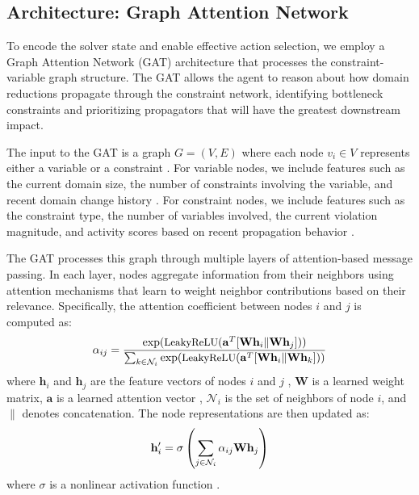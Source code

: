 \documentclass[11pt]{article}
\begin{document}
\subsection{Architecture: Graph Attention Network}

To encode the solver state and enable effective action selection, we employ a Graph Attention Network (GAT) architecture \citep{velickovic2018graph} that processes the constraint-variable graph structure. The GAT allows the agent to reason about how domain reductions propagate through the constraint network, identifying bottleneck constraints and prioritizing propagators that will have the greatest downstream impact.

The input to the GAT is a graph $G = (V, E)$ where each node $v_i \in V$ represents either a variable or a constraint \citep{velickovic2018graph,kipf2017semi,gehring2017convolutional}. For variable nodes, we include features such as the current domain size, the number of constraints involving the variable, and recent domain change history \citep{bessiere2006constraint}. For constraint nodes, we include features such as the constraint type, the number of variables involved, the current violation magnitude, and activity scores based on recent propagation behavior \citep{marques2012activity,moskewicz2001chaff}.

The GAT processes this graph through multiple layers of attention-based message passing. In each layer, nodes aggregate information from their neighbors using attention mechanisms that learn to weight neighbor contributions based on their relevance. Specifically, the attention coefficient between nodes $i$ and $j$ is computed as:
\begin{equation}
\small
\alpha_{ij} = \frac{\exp(\text{LeakyReLU}(\mathbf{a}^T [\mathbf{W}\mathbf{h}_i \| \mathbf{W}\mathbf{h}_j]))}{\sum_{k \in \mathcal{N}_i} \exp(\text{LeakyReLU}(\mathbf{a}^T [\mathbf{W}\mathbf{h}_i \| \mathbf{W}\mathbf{h}_k]))}
\end{equation}
where $\mathbf{h}_i$ and $\mathbf{h}_j$ are the feature vectors of nodes $i$ and $j$ \citep{velickovic2018graph}, $\mathbf{W}$ is a learned weight matrix, $\mathbf{a}$ is a learned attention vector \citep{vaswani2017attention}, $\mathcal{N}_i$ is the set of neighbors of node $i$, and $\|$ denotes concatenation. The node representations are then updated as:
\begin{equation}
\small
\mathbf{h}_i' = \sigma\left(\sum_{j \in \mathcal{N}_i} \alpha_{ij} \mathbf{W}\mathbf{h}_j\right)
\end{equation}
where $\sigma$ is a nonlinear activation function \citep{lecun1998gradient,hochreiter1997long}.
\end{document}
